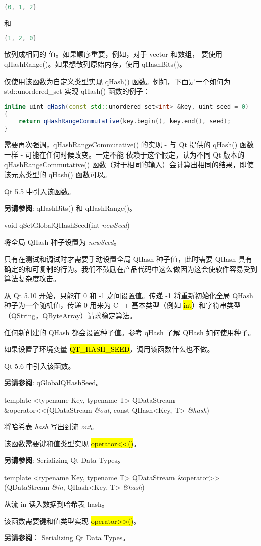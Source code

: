 \begin{lstlisting}[language=C++]
{0, 1, 2}
\end{lstlisting}

和

\begin{lstlisting}[language=C++]
{1, 2, 0}
\end{lstlisting}

散列成相同的 值。如果顺序重要，例如，对于 vector 和数组， 要使用 qHashRange()。如果想散列原始内存，使用 qHashBits()。

仅使用该函数为自定义类型实现 qHash() 函数。例如，下面是一个如何为
std::unordered\_set 实现 qHash() 函数的例子：

\begin{lstlisting}[language=C++]
inline uint qHash(const std::unordered_set<int> &key, uint seed = 0)
{
    return qHashRangeCommutative(key.begin(), key.end(), seed);
}
\end{lstlisting}

需要再次强调，qHashRangeCommutative() 的实现 - 与 Qt 提供的 qHash() 函数一样 - 可能在任何时候改变。一定不能 依赖于这个假定，认为不同 Qt 版本的 qHashRangeCommutative() 函数（对于相同的输入）会计算出相同的结果，即使该元素类型的 qHash() 函数可以。

Qt 5.5 中引入该函数。

\textbf{另请参阅}: qHashBits() 和 qHashRange()。

void qSetGlobalQHashSeed(int \emph{newSeed})

将全局 QHash 种子设置为 \emph{newSeed}。

只有在测试和调试时才需要手动设置全局 QHash 种子值，此时需要 QHash 具有确定的和可复制的行为。我们不鼓励在产品代码中这么做因为这会使软件容易受到 算法复杂度攻击。

从 Qt 5.10 开始，只能在 0 和 -1 之间设置值。传递 -1 将重新初始化全局 QHash 种子为一个随机值，传递 0 用来为 C++ 基本类型（例如 \hl{int}）和字符串类型（QString，QByteArray）请求稳定算法。

任何新创建的 QHash 都会设置种子值。参考 qHash 了解 QHash 如何使用种子。

如果设置了环境变量 \hl{QT\_HASH\_SEED}，调用该函数什么也不做。

Qt 5.6 中引入该函数。

\textbf{另请参阅}: qGlobalQHashSeed。

template <typename Key, typename T> QDataStream \&operator<<(QDataStream \emph{\&out}, const QHash<Key, T> \emph{\&hash})

将哈希表 \emph{hash} 写出到流 \emph{out}。

该函数需要键和值类型实现 \hl{operator<<()}。

\textbf{另请参阅}: Serializing Qt Data Types。

template <typename Key, typename T> QDataStream \&operator>>(QDataStream \emph{\&in}, QHash<Key, T> \emph{\&hash})

从流 in 读入数据到哈希表 hash。

该函数需要键和值类型实现 \hl{operator>>()}。

\textbf{另请参阅}： Serializing Qt Data Types。

